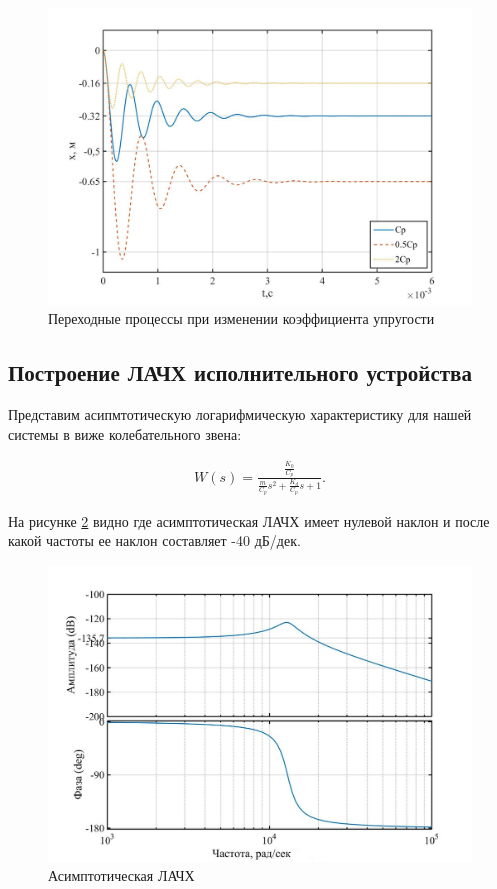 \documentclass[a4paper, 12pt]{article}
\begin{document}
\newpage

\begin{figure}[h!]
	\centering
	\includegraphics[width = 0.65\textheight]{data/Cp_x}
	\caption{Переходные процессы при изменении коэффициента упругости}
	\label{Cp_x}
\end{figure}

\newpage

\begin{center}
	\section{Построение ЛАЧХ исполнительного устройства}
\end{center}\par

Представим асипмтотическую логарифмическую характеристику для нашей системы в виже колебательного звена:

\begin{align}
	W(s) = \frac{\displaystyle{\frac{K_0}{C_p}}}{\displaystyle{\frac{m}{C_p}}s^2 + \frac{K_d}{C_p}s + 1}.
\end{align}

На рисунке \ref{lachx} видно где асимптотическая ЛАЧХ имеет нулевой наклон и после какой частоты ее наклон составляет -40 дБ/дек.

\begin{figure}[h!]
	\centering
	\includegraphics[width = 0.65\textheight]{data/lachx}
	\caption{Асимптотическая ЛАЧХ}
	\label{lachx}
\end{figure}
\end{document}
